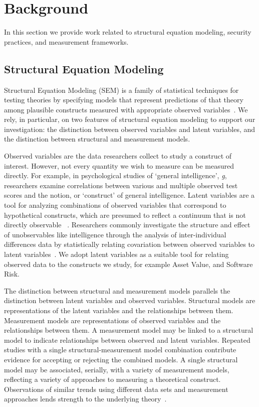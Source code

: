 \section{Background}
\label{sec:background}
In this section we provide work related to structural equation modeling, security practices, and measurement frameworks.

\subsection{Structural Equation Modeling}
Structural Equation Modeling (SEM) is a family of statistical techniques for testing theories by specifying models that represent predictions of that theory among plausible constructs measured with appropriate observed variables~\cite{kline2015principles}. We rely, in particular, on two features of structural equation modeling to support our investigation: the distinction between observed variables and latent variables, and the distinction between structural and measurement models.  

Observed variables are the data researchers collect to study a construct of interest. However, not every quantity we wish to measure can be measured directly. For example, in psychological studies of `general intelligence', \textit{g}, researchers examine correlations between various and multiple observed test scores and the notion, or `construct' of general intelligence. Latent variables are a tool for analyzing combinations of observed variables that correspond to hypothetical constructs, which are presumed to reflect a continuum that is not directly observable ~\cite{kline2015principles}.   Researchers commonly investigate the structure and effect of unobservables like intelligence through the analysis of inter-individual differences data by statistically relating covariation between observed variables to latent variables~\cite{borsboom2003theoretical}. 
We adopt latent variables as a suitable tool for relating observed data to the constructs we study, for example Asset Value, and Software Risk.

The distinction between structural and measurement models parallels the distinction between latent variables and observed variables. Structural models are representations of the latent variables and the relationships between them. Measurement models are representations of observed variables and the relationships between them.  A measurement model may be linked to a structural model to indicate relationships between observed and latent variables. Repeated studies with a single structural-measurement model combination contribute evidence for accepting or rejecting the combined models. A single structural model may be associated, serially, with a variety of measurement models, reflecting a variety of approaches to measuring a theoretical construct.  Observations of similar trends using different data sets and measurement approaches lends strength to the underlying theory~\cite{basili1999building,wohlin2000experimentation}. 

